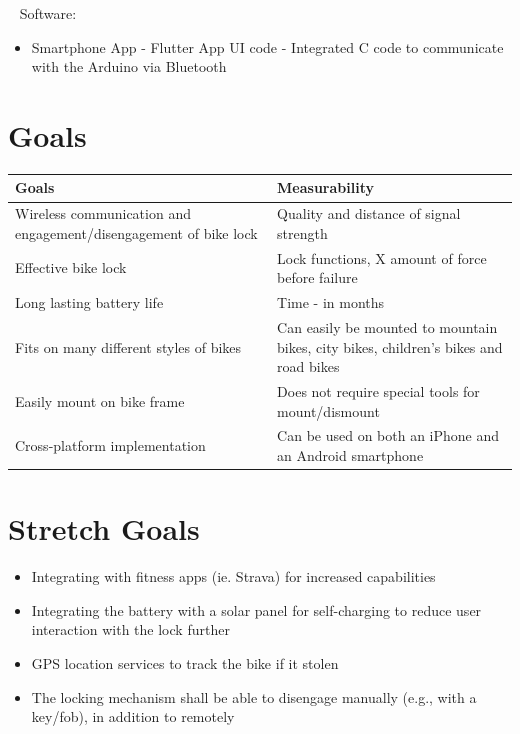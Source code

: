 \documentclass{article}
\begin{document}
~\newline
Software: 
\begin{itemize}
\item Smartphone App
\subitem - Flutter App UI code
\subitem - Integrated C code to communicate with the Arduino via Bluetooth
\end{itemize}


\section{Goals}
\begin{table}[hp]
  \begin{center}
    \begin{tabular}{| p{0.52\linewidth} | p{0.6\linewidth} |}
    \hline
      \textbf{Goals} & \textbf{Measurability}\\
      \hline
      Wireless communication and \newline engagement/disengagement of bike lock  & Quality and distance of signal strength\\
      \hline
      Effective bike lock  & Lock functions, X amount of force before failure\\
      \hline
      Long lasting battery life  & Time - in months \\
      \hline
      Fits on many different styles of bikes & Can easily be mounted to mountain bikes, city bikes, children's bikes and road bikes \\
      \hline
      Easily mount on bike frame & Does not require special tools for mount/dismount\\
      \hline
       Cross-platform implementation & Can be used on both an iPhone and an Android smartphone\\
      \hline
    \end{tabular}
  \end{center}
\end{table}

\section{Stretch Goals}
\begin{itemize}
\item Integrating with fitness apps (ie. Strava) for increased capabilities
\item Integrating the battery with a solar panel for self-charging to reduce user interaction with the lock further
\item GPS location services to track the bike if it stolen
\item The locking mechanism shall be able to disengage manually (e.g., with a key/fob), in addition to remotely
\end{itemize}
\end{document}
